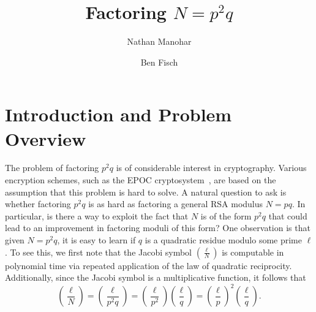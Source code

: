 \documentclass[letterpaper,twocolumn,10pt]{article}
\begin{document}
\date{}

\title{\Large \bf Factoring $N = p^2 q$}

\author{
{\rm Nathan Manohar}\\
\and
{\rm Ben Fisch}\\
} %

\maketitle

\thispagestyle{empty}



\section{Introduction and Problem Overview}

The problem of factoring $p^2 q$ is of considerable interest in cryptography. Various encryption schemes, such as the EPOC cryptosystem~\cite{Okamoto}, are based on the assumption that this problem is hard to solve. A natural question to ask is whether factoring $p^2q$ is as hard as factoring a general RSA modulus $N = pq$. In particular, is there a way to exploit the fact that $N$ is of the form $p^2q$ that could lead to an improvement in factoring moduli of this form? One observation is that given $N = p^2q$, it is easy to learn if $q$ is a quadratic residue modulo some prime $\ell$. To see this, we first note that the Jacobi symbol $\left(\frac{\ell}{N}\right)$ is computable in polynomial time via repeated application of the law of quadratic reciprocity. Additionally, since the Jacobi symbol is a multiplicative function, it follows that
\[
\left(\frac{\ell}{N}\right) = \left(\frac{\ell}{p^2q}\right) = \left(\frac{\ell}{p^2}\right) \left(\frac{\ell}{q}\right) = \left(\frac{\ell}{p}\right)^2 \left(\frac{\ell}{q}\right).
\]
\end{document}
